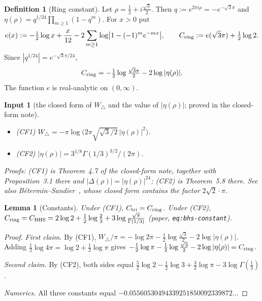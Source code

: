\documentclass[11pt]{article}
\newtheorem{lemma}[theorem]{Lemma}
\newtheorem{citedinput}[theorem]{Input}
\theoremstyle{definition}
\newtheorem{definition}[theorem]{Definition}
\theoremstyle{remark}
\newcommand{\Wtri}{W_{\triangle}}
\begin{document}
\begin{definition}[Ring constant]\label{def:ering}
Let $\rho=\tfrac12+i\tfrac{\sqrt3}2$. Then $q:=e^{2\pi i\rho}=-e^{-\sqrt3\pi}$ and
$\eta(\rho)=q^{1/24}\prod_{m\ge1}(1-q^m)$. For $x>0$ put
\[
e(x):=-\tfrac12\log x+\frac{x}{12}-2\sum_{m\ge1}\log\bigl|1-(-1)^me^{-mx}\bigr| ,
\qquad
C_{\rm ring}:=e(\sqrt3\pi)+\tfrac12\log2 .
\]
Since $|q^{1/24}|=e^{-\sqrt3\pi/24}$,
\[
C_{\rm ring}=-\tfrac12\log\tfrac{\sqrt3\pi}{2}-2\log|\eta(\rho)| .
\]
The function $e$ is real-analytic on $(0,\infty)$.
\end{definition}

\begin{citedinput}[the closed form of $\Wtri$ and the value of $|\eta(\rho)|$; proved in the closed-form note]\label{in:CS}
\begin{itemize}[leftmargin=*]
\item (CF1) $\Wtri=-\pi\log\bigl(2\pi\sqrt{\sqrt3/2}\,|\eta(\rho)|^2\bigr)$.
\item (CF2) $|\eta(\rho)|=3^{1/8}\Gamma(1/3)^{3/2}/(2\pi)$.
\end{itemize}
Proofs: (CF1) is Theorem~4.7 of the closed-form note, together with Proposition~3.1 there and $|\Delta(\rho)|=|\eta(\rho)|^{24}$;
(CF2) is Theorem~5.8 there. See also B\'etermin--Sandier~\cite[\S7.3]{BeterminSandier2018}, whose
closed form contains the factor $2\sqrt2\cdot\pi$.
\end{citedinput}

\begin{lemma}[Constants]\label{lem:constants}
Under (CF1), $C_{\mathrm{tri}}=C_{\rm ring}$. Under (CF2),
$C_{\rm ring}=C_{\rm BHS}=2\log2+\tfrac12\log\tfrac23+3\log\frac{\sqrt\pi}{\Gamma(1/3)}$
(paper, \texttt{eq:bhs-constant}).
\end{lemma}
\begin{proof}
\emph{First claim.} By (CF1),
$\Wtri/\pi=-\log2\pi-\tfrac12\log\tfrac{\sqrt3}2-2\log|\eta(\rho)|$. Adding
$\tfrac12\log4\pi=\log2+\tfrac12\log\pi$ gives
$-\tfrac12\log\pi-\tfrac12\log\tfrac{\sqrt3}{2}-2\log|\eta(\rho)|=C_{\rm ring}$.

\emph{Second claim.} By (CF2), both sides equal
$\tfrac52\log2-\tfrac12\log3+\tfrac32\log\pi-3\log\Gamma(\tfrac13)$.

\emph{Numerics.} All three constants equal $-0.05560530494339251850092339872\ldots$
\end{proof}
\end{document}
